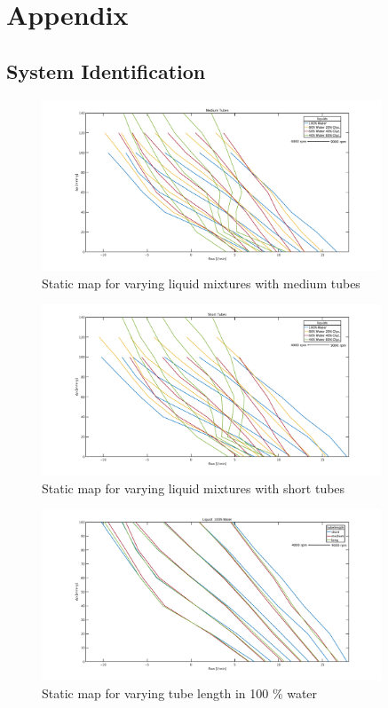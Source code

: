 \chapter{Appendix}
\section{System Identification}
\begin{figure}[h]
  \includegraphics[width=0.9\textwidth]{images/plots_syst_ident/medium_liquid_change.pdf}
  \caption[Static map for varying liquid mixtures with medium tubes]{Static map for varying liquid mixtures with medium tubes}
\end{figure}

\begin{figure}[h]
  \includegraphics[width=0.9\textwidth]{images/plots_syst_ident/short_liquid_change.pdf}
  \caption[Static map for varying liquid mixtures with short tubes]{Static map for varying liquid mixtures with short tubes}
\end{figure}

\begin{figure}[h]
  \includegraphics[width=0.9\textwidth]{images/plots_syst_ident/100w_tube_length.pdf}
  \caption[Static map for different tube length in 100 \% water]{Static map for varying tube length in 100 \% water}
\end{figure}

